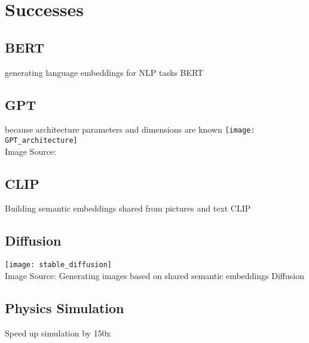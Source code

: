 \section{Successes}
\subsection{BERT}
\begin{frame}[c]
    generating language embeddings for NLP tasks
    BERT \cite{devlin_bert_2018}
\end{frame}

\subsection{GPT}
\begin{frame}[c]
    because architecture parameters and dimensions are known
    \texttt{[image: GPT\_architecture]} \\
    Image Source: \cite{gpt_2023}
\end{frame}

\subsection{CLIP}
\begin{frame}[c]
    Building semantic embeddings shared from pictures and text
    CLIP \cite{radford_learning_2021}
\end{frame}

\subsection{Diffusion}
\begin{frame}[c]
    \texttt{[image: stable\_diffusion]} \\
    Image Source: \cite{rombach_highresolution_2022}
    Generating images based on shared semantic embeddings
    Diffusion \cite{sohl-dickstein_deep_2015}
\end{frame}

\subsection{Physics Simulation}
\begin{frame}[c]
    Speed up simulation by 150x \cite{wiewel_latent_2019}
\end{frame}

